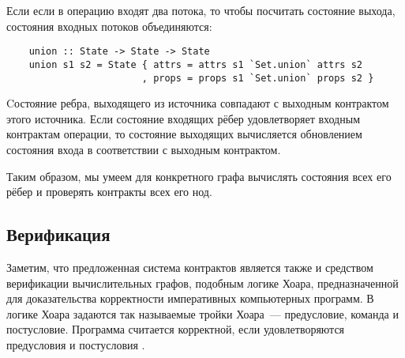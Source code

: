 Если если в операцию входят два потока, то чтобы посчитать состояние выхода, состояния входных потоков объединяются:

\begin{lstlisting}
    union :: State -> State -> State
    union s1 s2 = State { attrs = attrs s1 `Set.union` attrs s2
                        , props = props s1 `Set.union` props s2 }
\end{lstlisting}

Cостояние ребра, выходящего из источника совпадают с выходным контрактом этого источника. Если состояние входящих рёбер удовлетворяет входным контрактам операции, то состояние выходящих вычисляется обновлением состояния входа в соответствии с выходным контрактом.

Таким образом, мы умеем для конкретного графа вычислять состояния всех его рёбер и проверять контракты всех его нод.


\subsection{Верификация}

Заметим, что предложенная система контрактов является также и средством верификации вычислительных графов, подобным логике Хоара, предназначенной для доказательства корректности императивных компьютерных программ. В логике Хоара задаются так называемые тройки Хоара~--- предусловие, команда и постусловие. Программа считается корректной, если удовлетворяются предусловия и постусловия \cite{hoare}.
